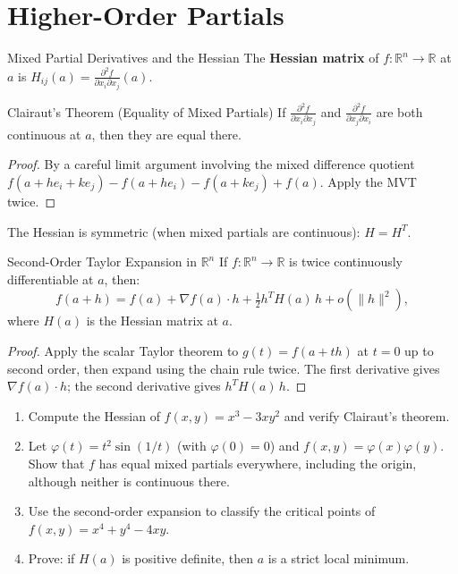 \documentclass[12pt, openany]{book}
\theoremstyle{plain}
\theoremstyle{definition}
\theoremstyle{remark}
\newcommand{\R}{\mathbb{R}}
\begin{document}
\chapter{Higher-Order Partials}
\color{black}

\begin{defbox}{Mixed Partial Derivatives and the Hessian}
The \textbf{Hessian matrix} of $f : \R^n \to \R$ at $a$ is $H_{ij}(a) = \frac{\partial^2 f}{\partial x_i \partial x_j}(a)$.
\end{defbox}
\color{black}

\begin{thmbox}{Clairaut's Theorem (Equality of Mixed Partials)}
If $\frac{\partial^2 f}{\partial x_i \partial x_j}$ and $\frac{\partial^2 f}{\partial x_j \partial x_i}$ are both continuous at $a$, then they are equal there.
\end{thmbox}
\color{black}

\begin{proof}
By a careful limit argument involving the mixed difference quotient $f(a+he_i+ke_j) - f(a+he_i) - f(a+ke_j) + f(a)$. Apply the MVT twice.
\end{proof}

The Hessian is symmetric (when mixed partials are continuous): $H = H^T$.


\begin{thmbox}{Second-Order Taylor Expansion in $\R^n$}
If $f:\R^n\to\R$ is twice continuously differentiable at $a$, then:
\[f(a+h) = f(a) + \nabla f(a)\cdot h + \tfrac{1}{2}h^T H(a)\, h + o(\|h\|^2),\]
where $H(a)$ is the Hessian matrix at $a$.
\end{thmbox}
\color{black}

\begin{proof}
Apply the scalar Taylor theorem to $g(t)=f(a+th)$ at $t=0$ up to second order,
then expand using the chain rule twice.
The first derivative gives $\nabla f(a)\cdot h$; the second derivative gives
$h^T H(a)\,h$.
\end{proof}

\begin{exbox}
\begin{enumerate}
  \item Compute the Hessian of $f(x,y)=x^3-3xy^2$ and verify Clairaut's theorem.
  \item Let $\varphi(t)=t^2\sin(1/t)$ (with $\varphi(0)=0$) and $f(x,y)=\varphi(x)\varphi(y)$. Show that
        $f$ has equal mixed partials everywhere, including the origin, although neither is continuous there.
  \item Use the second-order expansion to classify the critical points of
        $f(x,y)=x^4+y^4-4xy$.
  \item Prove: if $H(a)$ is positive definite, then $a$ is a strict local minimum.
\end{enumerate}
\end{exbox}
\color{black}
\end{document}

